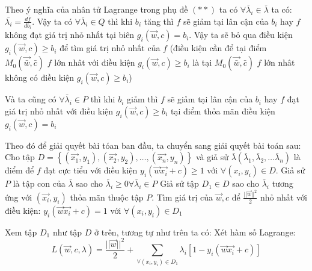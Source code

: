\documentclass{article}
\begin{document}
\begin{enumerate}
        Theo ý nghĩa của nhân tử Lagrange trong phụ đề $(**)$ ta có $\forall \bar{\lambda}_i \in \bar{\lambda}$ ta có:
        $\bar{\lambda_i} = \frac{d\bar{f}}{db_i}$.  \newline 
        Vậy ta có $\forall \bar{\lambda}_i \in Q$ thì khi $b_i$ tăng thì $f$
        sẽ giảm tại lân cận của $b_i$ hay $f$ không đạt giá trị nhỏ nhất tại biên $g_i(\vec{w},c) = b_i$. Vậy ta sẽ bỏ qua 
        điều kiện $g_i(\vec{w},c) \geq b_i$ để tìm giá trị nhỏ nhất của $f$ (điều kiện cần để tại điểm $M_0(\vec{\bar{w}},\bar{c})$
        $f$ lớn nhât với điều kiện $g_i(\vec{w},c) \geq b_i$ là tại $M_0(\vec{\bar{w}},\bar{c})$
        $f$ lớn nhât không có điều kiện $g_i(\vec{w},c) \geq b_i$) \newline 
        
        Và ta cũng có $\forall \bar{\lambda}_i \in P$ thì khi $b_i$ giảm thì $f$
        sẽ giảm tại lân cận của $b_i$ hay $f$ đạt giá trị nhỏ nhất với điều kiện $g_i(\vec{w},c) \geq b_i$ tại điểm 
        thỏa mãn điều kiện $g_i(\vec{w},c) = b_i$

        Theo đó để giải quyết bài tóan ban đầu, ta chuyển sang giải quyết bài toán sau: \newline 
        Cho tập $D =\left \{  (\vec{x_1},y_1), (\vec{x_2}, y_2), \dots, (\vec{x_n}, y_n) \right \}$ \newline
        và giả sử $\bar{\lambda}(\bar{\lambda} _1, \bar{\lambda} _2, \dots \bar{\lambda} _n)$ là điểm để $f$
        đạt cực tiểu với điều kiện $y_i(\vec{w}\vec{x_i} + c) \geq 1$ với $\forall (x_i, y_i) \in D$. \newline 
        Giả sử $P$ là tập con của $\bar{\lambda}$ sao cho $\bar{\lambda}_i \geq 0 \forall \bar{\lambda}_i \in P$ \newline 
        Giả sử tập $D_1 \in D$ sao cho $\bar{\lambda}_i$ tương ứng với $(\vec{x_i},y_i)$ thỏa mãn thuộc tập $P$.
        Tìm giá trị của $\vec{w}, c$ để $\frac{||\vec{w}||^{2}}{2}$ nhỏ nhất với điều kiện: 
        $y_i(\vec{w}\vec{x_i} + c) = 1$ \newline 
        với $\forall (x_i, y_i) \in D_1$ \newline 

        Xem tập $D_1$ như tập $D$ ở trên, tương tự như trên ta có: \newline 
        Xét hàm số Lagrange:
        $$L(\vec{w}, c, \lambda) = \frac{||\vec{w}||^{2}}{2} + \sum_{\forall (x_i, y_i) \in D_1}^{}{\lambda _i[1 - y_i(\vec{w}\vec{x_i} + c)]}$$


\end{enumerate}
\end{document}
